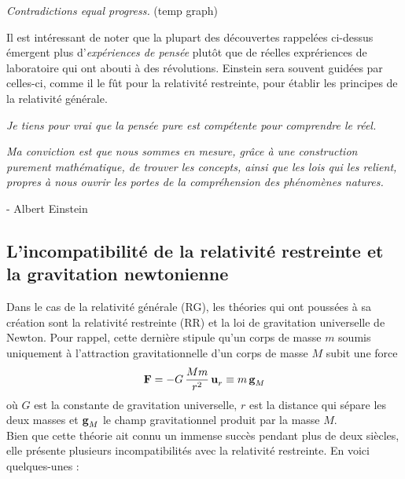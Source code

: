 \begin{center}
    \textit{Contradictions equal progress.} (temp graph)
\end{center}
Il est intéressant de noter que la plupart des découvertes rappelées ci-dessus émergent plus d'\emph{expériences de pensée} plutôt que de réelles exprériences de laboratoire qui ont abouti à des révolutions. Einstein sera souvent guidées par celles-ci, comme il le fût pour la relativité restreinte, pour établir les principes de la relativité générale.
\begin{center}
    \textit{Je tiens pour vrai que la pensée pure est compétente pour comprendre le réel.}
    
    \noindent \emph{Ma conviction est que nous sommes en mesure, grâce à une construction purement mathématique, de trouver les concepts, ainsi que les lois qui les relient, propres à nous ouvrir les portes de la compréhension des phénomènes natures.}
\end{center}
\begin{flushright}
    - Albert Einstein
\end{flushright}
\subsection{L'incompatibilité de la relativité restreinte et la gravitation newtonienne}
Dans le cas de la relativité générale (RG), les théories qui ont poussées à sa création sont la relativité restreinte (RR) et la loi de gravitation universelle de Newton. Pour rappel, cette dernière stipule qu'un corps de masse $m$ soumis uniquement à l'attraction gravitationnelle d'un corps de masse $M$ subit une force
\begin{equation}
    \vect{F} = -G \, \frac{M m}{r^2}\,\vect{u}\indices{_r} \deq m\,\vect{g}\indices{_M}
\end{equation}
où $G$ est la constante de gravitation universelle, $r$ est la distance qui sépare les deux masses et $\vect{g}\indices{_M}$ le champ gravitationnel produit par la masse $M$.\\
Bien que cette théorie ait connu un immense succès pendant plus de deux siècles, elle présente plusieurs incompatibilités avec la relativité restreinte. En voici quelques-unes :

